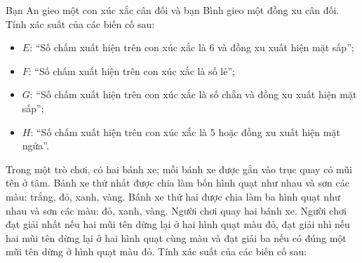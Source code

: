 \begin{practice}
    \begin{questions}[resume=SBT]
        \item Bạn An gieo một con xúc xắc cân đối và bạn Bình gieo một đồng xu cân đối. Tính xác suất của các biến cố sau:
        \begin{itemize}
            \item $E$: “Số chấm xuất hiện trên con xúc xắc là 6 và đồng xu xuất hiện mặt sấp”;
            \item $F$: “Số chấm xuất hiện trên con xúc xắc là số lẻ”;
            \item $G$: “Số chấm xuất hiện trên con xúc xắc là số chẵn và đồng xu xuất hiện mặt sấp”;
            \item $H$: “Số chấm xuất hiện trên con xúc xắc là 5 hoặc đồng xu xuất hiện mặt ngửa”.
        \end{itemize}
        \answerline
        \answerline
        \answerline

        \item Trong một trò chơi, có hai bánh xe; mỗi bánh xe được gắn vào trục quay có mũi tên ở tâm. Bánh xe thứ nhất được chia làm bốn hình quạt như nhau và sơn các màu: trắng, đỏ, xanh, vàng. Bánh xe thứ hai được chia làm ba hình quạt như nhau và sơn các màu: đỏ, xanh, vàng. Người chơi quay hai bánh xe. Người chơi đạt giải nhất nếu hai mũi tên dừng lại ở hai hình quạt màu đỏ, đạt giải nhì nếu hai mũi tên dừng lại ở hai hình quạt cùng màu và đạt giải ba nếu có đúng một mũi tên dừng ở hình quạt màu đỏ. Tính xác suất của các biến cố sau:

        \begin{center}
            \qquad
        \end{center}


\end{questions}
\end{practice}

